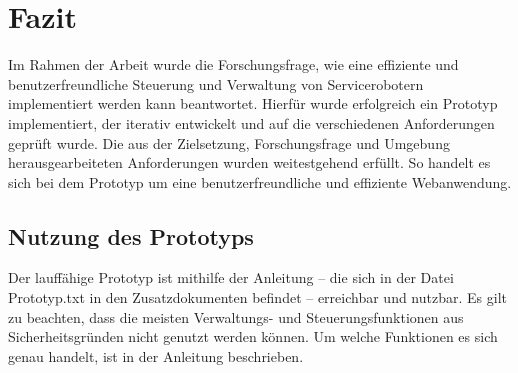 \newpage
\section{Fazit}
Im Rahmen der Arbeit wurde die Forschungsfrage, wie eine effiziente und benutzerfreundliche Steuerung und Verwaltung von Servicerobotern implementiert werden kann beantwortet. Hierfür wurde erfolgreich ein Prototyp implementiert, der iterativ entwickelt und auf die verschiedenen Anforderungen geprüft wurde. Die aus der Zielsetzung, Forschungsfrage und Umgebung herausgearbeiteten Anforderungen wurden weitestgehend erfüllt. So handelt es sich bei dem Prototyp um eine benutzerfreundliche und effiziente Webanwendung.

\subsection{Nutzung des Prototyps}
Der lauffähige Prototyp ist mithilfe der Anleitung – die sich in der Datei Prototyp.txt in den Zusatzdokumenten befindet – erreichbar und nutzbar. Es gilt zu beachten, dass die meisten Verwaltungs- und Steuerungsfunktionen aus Sicherheitsgründen nicht genutzt werden können. Um welche Funktionen es sich genau handelt, ist in der Anleitung beschrieben.


